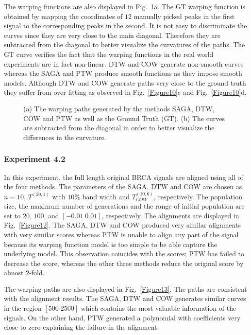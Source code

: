 \documentclass[number,1p,12pt]{elsarticle}
\begin{document}
The warping functions are also displayed in Fig.~\ref{Figure11}a. The GT warping function is obtained by mapping the coordinates of $12$ manually picked peaks in the first signal to the corresponding peaks in the second. It is not easy to discriminate the curves since they are very close to the main diagonal. Therefore they are subtracted from the diagonal to better visualize the curvatures of the paths. The GT curve verifies the fact that the warping functions in the real world experiments are in fact non-linear. DTW and COW generate non-smooth curves whereas the SAGA and PTW produce smooth functions as they impose smooth models. Although DTW and COW generate paths very close to the ground truth they suffer from over fitting as observed in Fig.~\ref{Figure10}c and Fig.~\ref{Figure10}d.
\begin{figure}
\caption{(a) The warping paths generated by the methods SAGA, DTW, COW and PTW as well as the Ground Truth (GT). (b) The curves are subtracted from the diagonal in order to better visualize the differences in the curvature.}
\label{Figure11}
\end{figure} 

\subsubsection{Experiment 4.2}
In this experiment, the full length original BRCA signals are aligned using all of the four methods. The parameters of the SAGA, DTW and COW are chosen as $n=10$, $T^{(20,1)}$ with $10\%$ band width and  $T_{COW}^{(10,6)}$, respectively. The population size, the maximum number of generations and the range of initial population are set to $20$, $100$, and $[-0.01\;0.01]$, respectively. The alignments are displayed in Fig.~\ref{Figure12}. The SAGA, DTW and COW produced very similar alignments with very similar scores whereas PTW is unable to align any part of the signal because its warping function model is too simple to be able capture the underlying model. This observation coincides with the scores; PTW has failed to decrease the score, whereas the other three methods reduce the original score by almost 2-fold. 

The warping paths are also displayed in Fig.~\ref{Figure13}. The paths are consistent with the alignment results. The SAGA, DTW and COW generates similar curves in the region $[500\;2500]$ which contains the most valuable information of the signals. On the other hand, PTW generated a polynomial with coefficients very close to zero explaining the failure in the alignment.
\end{document}
